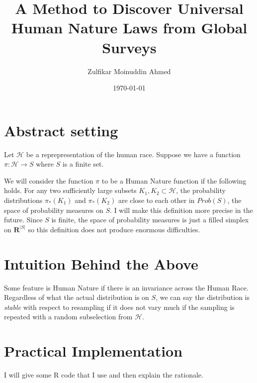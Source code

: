 \documentclass{amsart}
\title{A Method to Discover Universal Human Nature Laws from Global Surveys}
\author{Zulfikar Moinuddin Ahmed}
\date{\today}
\begin{document}
\maketitle

\section{Abstract setting}
Let $\mathcal{H}$ be a reprepresentation of the human race.  Suppose we have a function $\pi: \mathcal{H} \rightarrow S$ where $S$ is a finite set.

We will consider the function $\pi$ to be a Human Nature function if the following holds.  For any two sufficiently large subsets $K_1, K_2 \subset \mathcal{H}$, the probability distributions $\pi_*(K_1)$ and $\pi_*(K_2)$ are close to each other in $Prob(S)$, the space of probability measures on $S$.  I will make this definition more precise in the future. Since $S$ is finite, the space of probability measures is just a filled simplex on $\mathbf{R}^{|S|}$ so this definition does not produce enormous difficulties.

\section{Intuition Behind the Above}

Some feature is Human Nature if there is an invariance across the Human Race.  Regardless of what the actual distribution is on $S$, we can say the distribution is {\em stable} with respect to resampling if it does not vary much if the sampling is repeated with a random subselection from $\mathcal{H}$.  

\section{Practical Implementation}

I will give some R code that I use and then explain the rationale.
\end{document}
